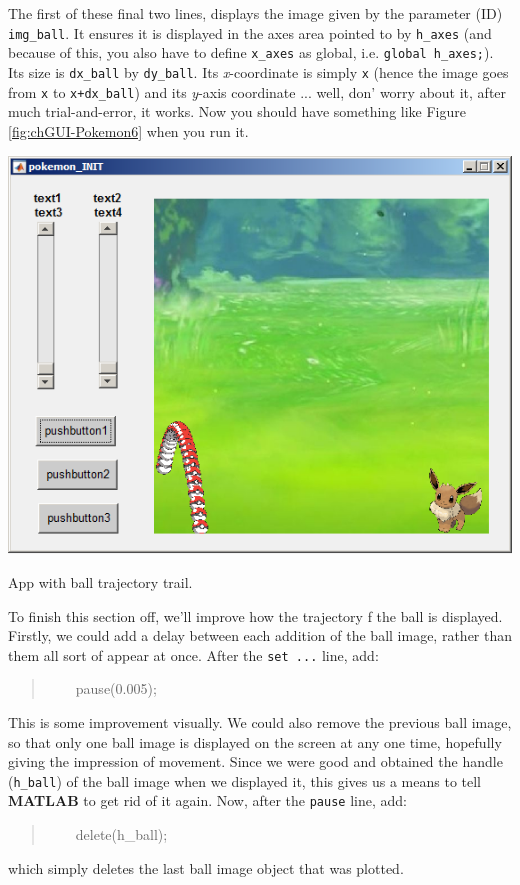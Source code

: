 \documentclass{tufte-book} %
\newenvironment{docspec}{\begin{quotation}\ttfamily\parskip0pt\parindent0pt\ignorespaces}{\end{quotation}}
\begin{document}
The first of these final two lines, displays the image given by the parameter (ID) \texttt{img\_ball}. It ensures it is displayed in the axes area pointed to by \texttt{h\_axes} (and because of this, you also have to define \texttt{x\_axes} as global, i.e. \texttt{global h\_axes;}). Its size is \texttt{dx\_ball} by \texttt{dy\_ball}. Its \textit{x}-coordinate is simply \texttt{x} (hence the image goes from \texttt{x} to \texttt{x+dx\_ball}) and its \textit{y}-axis coordinate ... well, don' worry about it, after much trial-and-error, it works.
Now you should have something like Figure \ref{fig:chGUI-Pokemon6} when you run it.

\begin{marginfigure}[0.0in]
\includegraphics[width=\linewidth]{chGUI-Pokemon6.png}
\caption{App with ball trajectory trail.}
\label{fig:chGUI-Pokemon6}
\end{marginfigure}

To finish this section off, we'll improve how the trajectory f the ball is displayed. Firstly, we could add a delay between each addition of the ball image, rather than them all sort of appear at once. After the \texttt{set ...} line, add:
\begin{docspec}
\ \ \ \ pause(0.005);
\end{docspec}
This is some improvement visually. We could also remove the previous ball image, so that only one ball image is displayed on the screen at any one time, hopefully giving the impression of movement. Since we were good and obtained the handle (\texttt{h\_ball}) of the ball image when we displayed it, this gives us a means to tell \textbf{MATLAB} to get rid of it again. Now, after the \texttt{pause} line, add:
\begin{docspec}
\ \ \ \    delete(h\_ball);
\end{docspec}
which simply deletes the last ball image object that was plotted.
\end{document}
